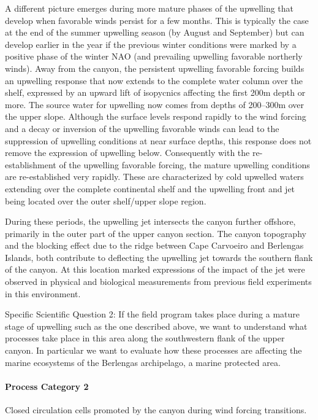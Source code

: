 A different picture emerges during more mature phases of the upwelling
that develop when favorable winds persist for a few months. This is
typically the case at the end of the summer upwelling season (by
August and September) but can develop earlier in the year if the
previous winter conditions were marked by a positive phase of the
winter NAO (and prevailing upwelling favorable northerly winds). Away
from the canyon, the persistent upwelling favorable forcing builds an
upwelling response that now extends to the complete water column over
the shelf, expressed by an upward lift of isopycnics affecting the
first 200m depth or more. The source water for upwelling now comes
from depths of 200--300m over the upper slope. Although the surface
levels respond rapidly to the wind forcing and a decay or inversion of
the upwelling favorable winds can lead to the suppression of upwelling
conditions at near surface depths, this response does not remove the
expression of upwelling below. Consequently with the re-establishment
of the upwelling favorable forcing, the mature upwelling conditions
are re-established very rapidly. These are characterized by cold
upwelled waters extending over the complete continental shelf and the
upwelling front and jet being located over the outer shelf/upper slope
region.

During these periods, the upwelling jet intersects the \naz canyon
further offshore, primarily in the outer part of the upper canyon
section. The canyon topography and the blocking effect due to the
ridge between Cape Carvoeiro and Berlengas Islands, both contribute to
deflecting the upwelling jet towards the southern flank of the
canyon. At this location marked expressions of the impact of the jet
were observed in physical and biological measurements from previous
field experiments in this environment. 

 
\textsf{Specific Scientific Question 2:} If the \proj field program
takes place during a mature stage of upwelling such as the one
described above, we want to understand what processes take place in
this area along the southwestern flank of the upper \naz canyon. In
particular we want to evaluate how these processes are affecting the
marine ecosystems of the Berlengas archipelago, a marine protected
area.

\par

\paragraph{Process Category 2} Closed circulation cells promoted by
the canyon during wind forcing transitions.

